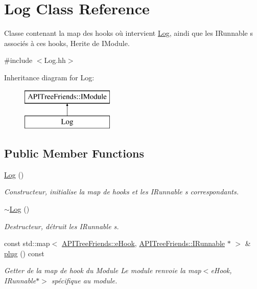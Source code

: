 \hypertarget{class_log}{}\section{Log Class Reference}
\label{class_log}


Classe contenant la map des hooks où intervient \hyperlink{class_log}{Log}, aindi que les I\+Runnable s associés à ces hooks, Herite de I\+Module.  




{\ttfamily \#include $<$Log.\+hh$>$}

Inheritance diagram for Log\+:\begin{figure}[H]
\begin{center}
\leavevmode
\includegraphics[height=2.000000cm]{class_log}
\end{center}
\end{figure}
\subsection*{Public Member Functions}
\begin{DoxyCompactItemize}
\item 
\hypertarget{class_log_af6071a60aa52b6c1b511f99b4bc1b8fe}{}\hyperlink{class_log_af6071a60aa52b6c1b511f99b4bc1b8fe}{Log} ()\label{class_log_af6071a60aa52b6c1b511f99b4bc1b8fe}

\begin{DoxyCompactList}\small\item\em Constructeur, initialise la map de hooks et les I\+Runnable s correspondants. \end{DoxyCompactList}\item 
\hypertarget{class_log_a0fbfda88fbee5027c89f6eb121059360}{}\hyperlink{class_log_a0fbfda88fbee5027c89f6eb121059360}{$\sim$\+Log} ()\label{class_log_a0fbfda88fbee5027c89f6eb121059360}

\begin{DoxyCompactList}\small\item\em Destructeur, détruit les I\+Runnable s. \end{DoxyCompactList}\item 
const std\+::map$<$ \hyperlink{namespace_a_p_i_tree_friends_a3943902c0fe96b820b0261e510dcb720}{A\+P\+I\+Tree\+Friends\+::e\+Hook}, \hyperlink{class_a_p_i_tree_friends_1_1_i_runnable}{A\+P\+I\+Tree\+Friends\+::\+I\+Runnable} $\ast$ $>$ \& \hyperlink{class_log_a37a35c29d8d337a510bf82e94a7c4350}{plug} () const 
\begin{DoxyCompactList}\small\item\em Getter de la map de hook du Module Le module renvoie la map$<$e\+Hook, I\+Runnable$\ast$$>$ spécifique au module. \end{DoxyCompactList}\end{DoxyCompactItemize}


